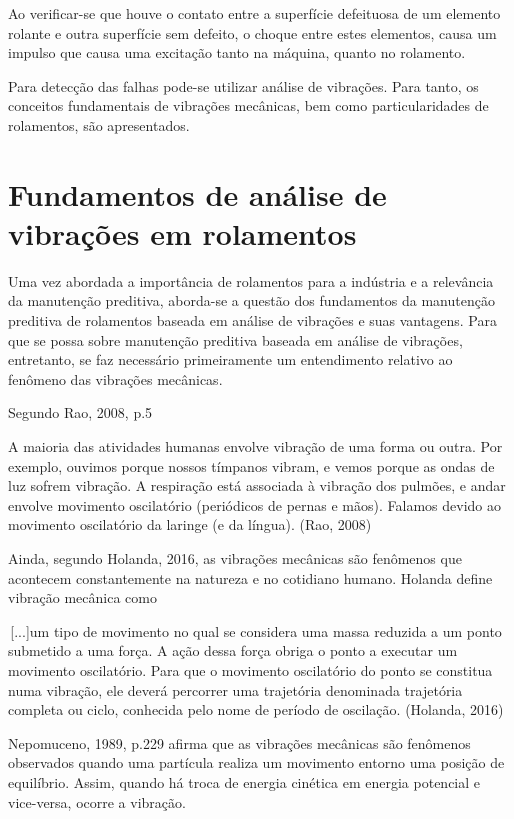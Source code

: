 \documentclass[
	12pt,				
	oneside,			
	a4paper,			
	english,			
	brazil				
	]{abntex2ppgsi}
\begin{document}
Ao verificar-se que houve o contato entre a superfície defeituosa de um elemento rolante e outra superfície sem defeito, o choque entre estes elementos, causa um impulso que causa uma excitação tanto na máquina, quanto no rolamento. 

Para detecção das falhas pode-se utilizar análise de vibrações. Para tanto, os conceitos fundamentais de vibrações mecânicas, bem como particularidades de rolamentos, são apresentados.

\section{\textbf{Fundamentos de análise de vibrações em rolamentos}}

Uma vez abordada a importância de rolamentos para a indústria e a relevância da manutenção preditiva, aborda-se a questão dos fundamentos da manutenção preditiva de rolamentos baseada em análise de vibrações e suas vantagens. Para que se possa sobre manutenção preditiva baseada em análise de vibrações, entretanto, se faz necessário primeiramente um entendimento relativo ao fenômeno das vibrações mecânicas. 

Segundo Rao, 2008, p.5

\begin{citacao}
A maioria das atividades humanas envolve vibração de uma forma ou outra. Por exemplo, ouvimos porque nossos tímpanos vibram, e vemos porque as ondas de luz sofrem vibração. A respiração está associada à vibração dos pulmões, e andar envolve movimento oscilatório (periódicos de pernas e mãos). Falamos devido ao movimento oscilatório da laringe (e da língua). (Rao, 2008)
\end{citacao}

Ainda, segundo Holanda, 2016, as vibrações mecânicas são fenômenos que acontecem constantemente na natureza e no cotidiano humano. Holanda define vibração mecânica como

\begin{citacao}
\,[...]um tipo de movimento no qual se considera uma massa reduzida a um ponto submetido a uma força. A ação dessa força obriga o ponto a executar um movimento oscilatório. Para que o movimento oscilatório do ponto se constitua numa vibração, ele deverá percorrer uma trajetória denominada trajetória completa ou ciclo, conhecida pelo nome de período de oscilação. (Holanda, 2016)
\end{citacao}

Nepomuceno, 1989, p.229 afirma que as vibrações mecânicas são fenômenos observados quando uma partícula realiza um movimento entorno uma posição de equilíbrio. Assim, quando há troca de energia cinética em energia potencial e vice-versa, ocorre a vibração. 
\end{document}
